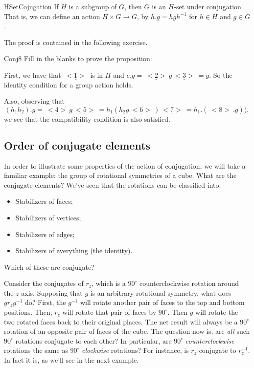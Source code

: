 \begin{prop}{HSetCojugation} If $H$ is a subgroup of $G$, then $G$ is an $H$-set under conjugation.  That is, we can define an action $H \times G\rightarrow G$, by $h.g=hgh^{-1}$ for $h\in H$ and $g\in G$. 
\end{prop}
The proof is contained in the following exercise.

\begin{exercise}{Conj8}
Fill in the blanks to prove the proposition:

\noindent
First, we have that $\underline{~<1>~}$ is in  $H$ and $e.g=\underline{~<2>~}g\underline{~<3>~} = g$.
So the identity condition for a group action holds. 

Also, observing that
\[(h_1h_2).g =\underline{~<4>~}g\underline{~<5>~}
= h_1(h_2g\underline{~<6>~} )\underline{~<7>~}
= h_1. (\underline{~<8>~}. g)),\]
we see that the compatibility condition is also satisfied.
\end{exercise}

\subsection{Order of conjugate elements}
\label{subsec:GroupActions:Conjugation:ConjugateElements}

In order to illustrate some properties of the action of conjugation, we will take a familiar example: the group of rotational symmetries of a cube.
What are the conjugate elements?
We've seen that the rotations can be classified into:
\begin{itemize}
\item
Stabilizers of faces;
\item
Stabilizers of vertices;
\item
Stabilizers of edges;
\item
Stabilizers of everything (the identity).
\end{itemize}
Which of these are conjugate? 


Consider the conjugates of $r_z$, which is a  $90^{\circ}$ counterclockwise rotation around the $z$ axis. Supposing that $g$ is an arbitrary rotational symmetry, what does $g r_z g^{-1}$ do? First, the $g^{-1}$ will rotate another pair of faces to the top and bottom positions. Then, $r_z$ will rotate that pair of faces by  $90^{\circ}$. Then $g$ will rotate the two rotated faces back to their original places. The net result will always be a  $90^{\circ}$ rotation of an opposite pair of faces of the cube. 
The question now is, are \emph{all} such  $90^{\circ}$ rotations conjugate to each other? In particular, are  $90^{\circ}$ \emph{counterclockwise} rotations the same as  $90^{\circ}$ \emph{clockwise} rotations? For instance, is $r_z$ conjugate to $r_z^{-1}$.  In fact it is, as we'll see in the next example.

